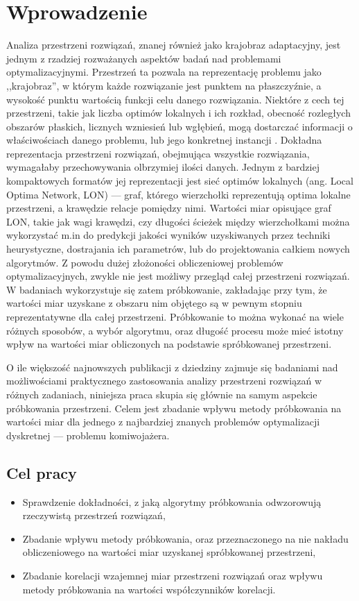 \chapter{Wprowadzenie}

Analiza przestrzeni rozwiązań, znanej również jako krajobraz adaptacyjny, jest jednym z rzadziej rozważanych aspektów badań nad problemami optymalizacyjnymi.
Przestrzeń ta pozwala na reprezentację problemu jako ,,krajobraz'', w którym każde rozwiązanie jest punktem na płaszczyźnie, a wysokość punktu wartością funkcji celu
danego rozwiązania.
Niektóre z cech tej przestrzeni, takie jak liczba optimów lokalnych i ich rozkład, obecność rozległych obszarów płaskich,
licznych wzniesień lub wgłębień, mogą dostarczać informacji o właściwościach danego problemu, lub jego konkretnej instancji \cite{DBLP:journals/corr/OchoaVDT14}.
Dokładna reprezentacja przestrzeni rozwiązań, obejmująca wszystkie rozwiązania,
wymagałaby przechowywania olbrzymiej ilości danych.
Jednym z bardziej kompaktowych formatów jej reprezentacji jest sieć optimów lokalnych (ang. Local Optima Network, LON) --- graf, którego wierzchołki reprezentują
optima lokalne przestrzeni, a krawędzie relacje pomiędzy nimi.
Wartości miar opisujące graf LON, takie jak wagi krawędzi, czy długości ścieżek między wierzchołkami można wykorzystać
m.in do predykcji jakości wyników uzyskiwanych przez techniki heurystyczne, dostrajania ich parametrów, lub do projektowania całkiem nowych algorytmów.
Z powodu dużej złożoności obliczeniowej problemów optymalizacyjnych, zwykle nie jest możliwy przegląd całej przestrzeni rozwiązań.
W badaniach wykorzystuje się zatem próbkowanie, zakładając przy tym, że wartości miar uzyskane z obszaru nim objętego
są w pewnym stopniu reprezentatywne dla całej przestrzeni. Próbkowanie to można wykonać na wiele różnych sposobów,
a wybór algorytmu, oraz długość procesu może mieć istotny wpływ na wartości miar obliczonych na podstawie spróbkowanej przestrzeni.

O ile większość najnowszych publikacji z dziedziny zajmuje się badaniami nad możliwościami praktycznego zastosowania analizy przestrzeni rozwiązań w różnych zadaniach,
niniejsza praca skupia się głównie na samym aspekcie próbkowania przestrzeni.
Celem jest zbadanie wpływu metody próbkowania na wartości miar dla jednego z najbardziej znanych
problemów optymalizacji dyskretnej --- problemu komiwojażera.

\section{Cel pracy}
\begin{itemize}
    \item Sprawdzenie dokładności, z jaką algorytmy próbkowania odwzorowują rzeczywistą przestrzeń rozwiązań,
    \item Zbadanie wpływu metody próbkowania, oraz przeznaczonego na nie nakładu obliczeniowego na wartości miar uzyskanej spróbkowanej przestrzeni,
    \item Zbadanie korelacji wzajemnej miar przestrzeni rozwiązań oraz wpływu metody próbkowania na wartości współczynników korelacji.
\end{itemize}

